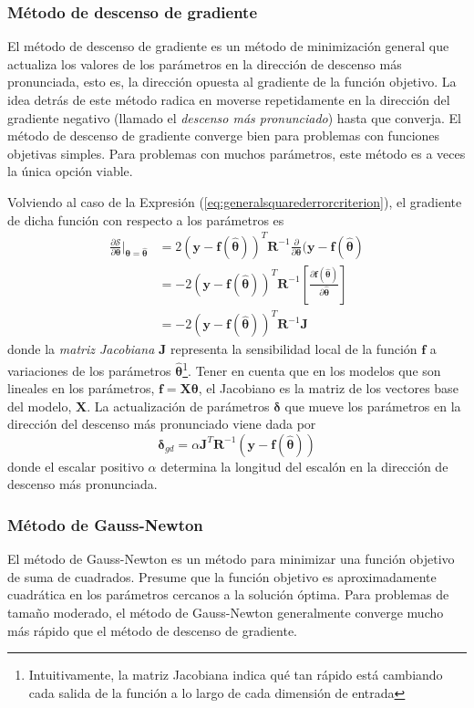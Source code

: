 \subsubsection{Método de descenso de gradiente}

El método de descenso de gradiente es un método de minimización general que actualiza los valores de los parámetros en la dirección de descenso más pronunciada, esto es, la dirección opuesta al gradiente de la función objetivo. La idea detrás de este método radica en moverse repetidamente en la dirección del gradiente negativo (llamado el \textit{descenso más pronunciado}) hasta que converja. El método de descenso de gradiente converge bien para problemas con funciones objetivas simples. Para problemas con muchos parámetros, este método es a veces la única opción viable.

Volviendo al caso de la Expresión (\ref{eq:generalsquarederrorcriterion}), el gradiente de dicha función con respecto a los parámetros es
\begin{align}
    \frac{\partial \mathscr{S}}{\partial \bm{\theta}}\bigg\rvert_{\bm{\theta}=\hat{\bm{\theta}}} &= 2(\bm{y} - \bm{f}(\hat{\bm{\theta}}))^T \bm{R}^{-1}\frac{\partial}{\partial \bm{\theta}}(\bm{y} - \bm{f}(\hat{\bm{\theta}}) \\
    &= -2(\bm{y} - \bm{f}(\hat{\bm{\theta}}))^T \bm{R}^{-1}\left[\frac{\partial \bm{f}(\hat{\bm{\theta}})}{\partial \hat{\bm{\theta}}}\right] \\
    &= -2(\bm{y} - \bm{f}(\hat{\bm{\theta}}))^T \bm{R}^{-1}\bm{J}
\end{align}
donde la \textit{matriz Jacobiana} $\bm{J}$ representa la sensibilidad local de la función $\bm{f}$ a variaciones de los parámetros $\hat{\bm{\theta}}$\footnote{Intuitivamente, la matriz Jacobiana indica qué tan rápido está cambiando cada salida de la función a lo largo de cada dimensión de entrada}. Tener en cuenta que en los modelos que son lineales en los parámetros, $\bm{f} = \bm{X}\bm{\theta}$, el Jacobiano es la matriz de los vectores base del modelo, $\bm{X}$. La actualización de parámetros $\bm{\delta}$ que mueve los parámetros en la dirección del descenso más pronunciado viene dada por
\begin{equation}
    \bm{\delta}_{gd} = \alpha\bm{J}^T\bm{R}^{-1}(\bm{y} - \bm{f}(\hat{\bm{\theta}}))
\end{equation}
donde el escalar positivo $\alpha$ determina la longitud del escalón en la dirección de descenso más pronunciada.

\subsubsection{Método de Gauss-Newton}
El método de Gauss-Newton es un método para minimizar una función objetivo de suma de cuadrados. Presume que la función objetivo es aproximadamente cuadrática en los parámetros cercanos a la solución óptima. Para problemas de tamaño moderado, el método de Gauss-Newton generalmente converge mucho más rápido que el método de descenso de gradiente.

